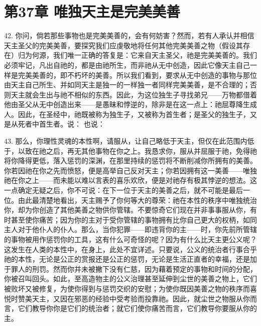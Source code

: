 
\section{第37章 唯独天主是完美美善}

42. 你问，倘若那些事物也是完美美善的，会有何妨害？然而，若有人承认并相信天主圣父的完美美善，要探究我们应虔敬地将任何其他完美美善之物（假设其存在）归为何源，我们唯一正确的答复是：它来自天主圣父，祂是完美美善的。我们必须牢记，凡出自祂的，都是由祂所生，而非祂从无中创造，因此它像天主自己一样是完美美善的，即不朽坏的美善。所以我们看到，要求从无中创造的事物与那位由天主自己所生、并如同天主是独一的一样独一者同样完美美善，是不合理的；否则天主就会生出与祂不相似的东西。因此，为这位独生子寻找弟兄——万物都借着他由圣父从无中创造出来——是愚昧和悖逆的，除非是在这一点上：祂屈尊降生成人。因此，在圣经中，祂既被称为独生子，又被称为首生者；是圣父的独生子，又是从死者中首生者。说： 也说：\par

43. 那么，你理性灵魂的本性啊，请服从，让自己略低于天主，但仅在此范围内低于，以致在祂之后，再无其他事物在你之上。我恳求你，服从并屈服于祂，免得祂将你降得更低，落入惩罚的深渊，在那里持续的惩罚将不断削减你所拥有的美善。你若因祂在你之先而愤怒，便是高举自己反对天主；你若因拥有这一美善——唯独祂在你之上——而未能以难以言表的喜乐欢欣，便是对祂存有极其悖逆的想法。这一点确定无疑之后，你不可说：在下一位于天主的美善之后，就不可能是最后一位。由此最清楚地看出，天主赐予了你何等大的尊荣：祂在本性的秩序中唯独统治你，却为你创造了其他美善之物供你管辖。不要惊奇它们现在并非事事服从你，有时甚至使你痛苦；因为你的主对于受你管辖的事物拥有比你自己更大的权柄，如同主人对于他仆人的仆人。那么，当你犯罪——即违背你的主——时，你先前所管辖的事物被用作惩罚你的工具，这有什么可奇怪的呢？因为有什么比天主更公义呢？这发生在人类的本性中，在身上，此处不宜详述。只要说，公义的统治者行事合乎祂的本性，无论是公正的赏报还是公正的惩罚，无论是生活正直者的幸福，还是加于罪人的刑罚。然而你并未被撇下没有仁慈，因为藉着预定的事物和时间的分配，你被召叫回头。如此，至高造物主的公义治理甚至延伸到尘世的美善之物上，它们被败坏又被修复，为使你得到与惩罚交织的安慰；为使你既因美善之物的秩序而喜悦时赞美天主，又因在邪恶的经验中受考验而投靠祂。因此，就尘世之物服从你而言，它们教导你你是它们的统治者；就它们使你痛苦而言，它们教导你要服从你的主。\par

